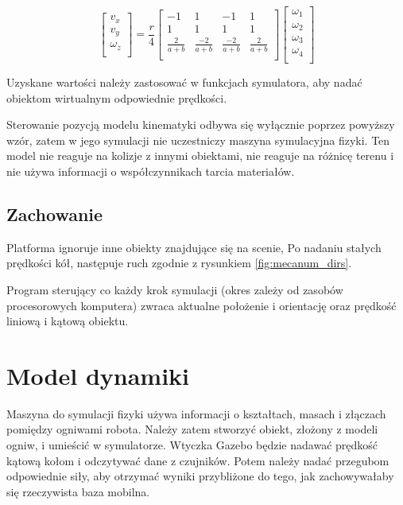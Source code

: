 	\begin{equation}
	\begin{bmatrix}
	v_x \\
	v_y \\
	\omega_z \\
	\end{bmatrix}
	=
	\frac{r}{4}
	\begin{bmatrix}
	-1 & 1 & -1 & 1 \\
	1 & 1 & 1 & 1 \\
	\frac{2}{a+b} & \frac{-2}{a+b} & \frac{-2}{a+b} & \frac{2}{a+b} \\
	\end{bmatrix}
	\begin{bmatrix}
	\omega_1 \\
	\omega_2 \\
	\omega_3 \\
	\omega_4 \\
	\end{bmatrix}
	\end{equation}
	
	Uzyskane wartości należy zastosować w funkcjach symulatora, aby nadać obiektom wirtualnym odpowiednie prędkości.
	
	Sterowanie pozycją modelu kinematyki odbywa się wyłącznie poprzez powyższy wzór, zatem w jego symulacji nie uczestniczy maszyna symulacyjna fizyki.
	Ten model nie reaguje na kolizje z innymi obiektami, nie reaguje na różnicę terenu i nie używa informacji o współczynnikach tarcia materiałów.

	\subsection{Zachowanie}
		Platforma ignoruje inne obiekty znajdujące się na scenie,
		Po nadaniu stałych prędkości kół, następuje ruch zgodnie z rysunkiem \ref{fig:mecanum_dirs}.

		Program sterujący co każdy krok symulacji (okres zależy od zasobów procesorowych komputera) zwraca aktualne położenie i orientację oraz prędkość liniową i kątową obiektu.

\section{Model dynamiki}
	\label{sec:omnivelma}
	Maszyna do symulacji fizyki używa informacji o kształtach, masach i złączach pomiędzy ogniwami robota.
	Należy zatem stworzyć obiekt, złożony z modeli ogniw, i umieścić w symulatorze.
	Wtyczka Gazebo będzie nadawać prędkość kątową kołom i odczytywać dane z czujników.
	Potem należy nadać przegubom odpowiednie siły, aby otrzymać wyniki przybliżone do tego, jak zachowywałaby się rzeczywista baza mobilna.

